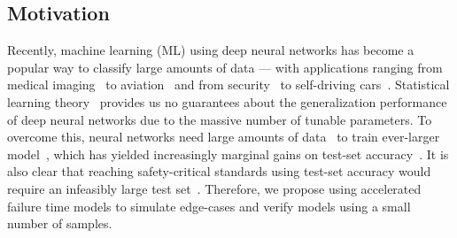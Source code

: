 \documentclass[conference]{IEEEtran}
\begin{document}
\subsection{Motivation}

Recently, machine learning (ML) using deep neural networks has become a popular way to classify large amounts of data --- with applications ranging from medical imaging~\cite{ai_medical_imaging} to aviation~\cite{ai_aviation} and from security~\cite{ai_security,ai_luggage,ai_prison} to self-driving cars~\cite{ai_automotive}. 
Statistical learning theory~\cite{vcdimension} provides us no guarantees about the generalization performance of deep neural networks due to the massive number of tunable parameters. To overcome this, neural networks need large amounts of data~\cite{desislavov2021compute,bailly2022effects} to train ever-larger model~\cite{desislavov2021compute}, which has yielded increasingly marginal gains on test-set accuracy~\cite{sun2017revisiting}. It is also clear that reaching safety-critical standards using test-set accuracy would require an infeasibly large test set~\cite{meyers}. Therefore, we propose using accelerated failure time models to simulate edge-cases and verify models using a small number of samples.
\end{document}
